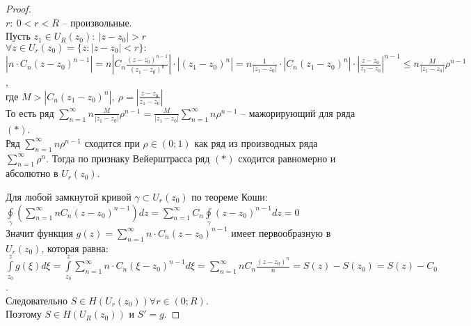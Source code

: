 \begin{proof}
    \ \\
    $r: \ 0<r<R$ -- произвольные.\\
    Пусть $z_1 \in U_R(z_0): \ |z-z_0| > r$\\
    $\forall z \in U_r(z_0) = \{z: |z-z_0|<r\}:$\\
    $|n\cdot C_n(z-z_0)^{n-1}| = n\left|C_n\frac{(z-z_0)^{n-1}}{(z_1-z_0)^n}\right|\cdot |(z_1-z_0)^n|=n\frac{1}{|z_1-z_0|}\cdot |C_n (z_1-z_0)^n|\cdot \left|\frac{z-z_0}{z_1-z_0}\right|^{n-1}\leq n\frac{M}{|z_1-z_0|}\rho^{n-1}$,\\
    где $M > |C_n (z_1-z_0)^n|, \ \rho = \left|\frac{z-z_0}{z_1-z_0}\right|$\\
    То есть ряд $\sum_{n=1}^\infty n\frac{M}{|z_1-z_0|}\rho^{n-1}=\frac{M}{|z_1-z_0|}\sum_{n=1}^\infty n\rho^{n-1}$ -- мажорирующий для ряда $(*)$.\\
    Ряд $\sum_{n=1}^\infty n\rho^{n-1}$ сходится при $\rho \in (0; 1)$ как ряд из производных ряда $\sum_{n=1}^\infty\rho^n$. Тогда по признаку Вейерштрасса ряд $(*)$ сходится равномерно и абсолютно в $U_r(z_0)$.

    Для любой замкнутой кривой $\gamma \subset U_r(z_0)$ по теореме Коши:\\
    $\oint\limits_{\gamma}\left( \sum_{n=1}^\infty n C_n (z-z_0)^{n-1} \right)dz=\sum_{n=1}^\infty C_n \oint\limits_{\gamma}(z-z_0)^{n-1}dz=0$\\
    Значит функция $g(z)=\sum_{n=1}^\infty n\cdot C_n(z-z_0)^{n-1}$ имеет первообразную в $U_r(z_0)$, которая равна:\\
    $\int\limits_{z_0}^z g(\xi)d\xi = \int\limits_{z_0}^z\sum_{n=1}^{\infty} n\cdot C_n (\xi-z_0)^{n-1}d\xi=\sum_{n=1}^{\infty} n C_n \frac{(z-z_0)^n}{n} = S(z)-S(z_0) = S(z)-C_0$.\\
    Следовательно $S \in H(U_r(z_0)) \forall r \in (0; R)$.\\
    Поэтому $S \in H(U_R(z_0))$ и $S'=g$.
\end{proof}

